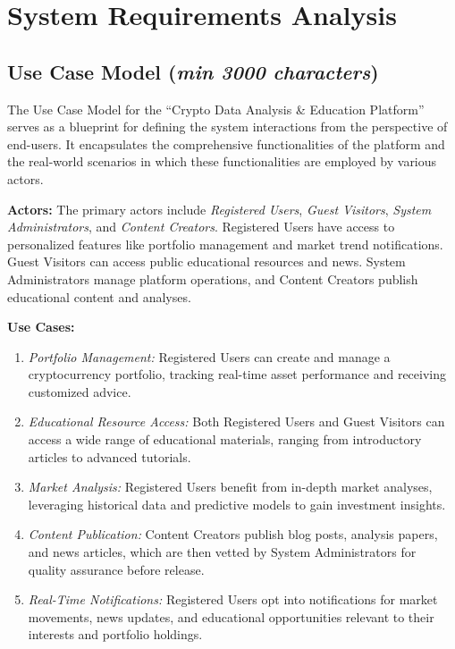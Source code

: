 \documentclass[12pt]{report}
\newcommand{\characters}[1]{(\textit{min #1 characters})}
\begin{document}
\section{System Requirements Analysis}

\subsection{Use Case Model \characters{3000}}
The Use Case Model for the ``Crypto Data Analysis \& Education Platform'' serves as a blueprint for defining the system interactions from the perspective of end-users. It encapsulates the comprehensive functionalities of the platform and the real-world scenarios in which these functionalities are employed by various actors.

\textbf{Actors:} The primary actors include \textit{Registered Users}, \textit{Guest Visitors}, \textit{System Administrators}, and \textit{Content Creators}. Registered Users have access to personalized features like portfolio management and market trend notifications. Guest Visitors can access public educational resources and news. System Administrators manage platform operations, and Content Creators publish educational content and analyses.

\textbf{Use Cases:}
\begin{enumerate}
    \item \textit{Portfolio Management:} Registered Users can create and manage a cryptocurrency portfolio, tracking real-time asset performance and receiving customized advice.
    \item \textit{Educational Resource Access:} Both Registered Users and Guest Visitors can access a wide range of educational materials, ranging from introductory articles to advanced tutorials.
    \item \textit{Market Analysis:} Registered Users benefit from in-depth market analyses, leveraging historical data and predictive models to gain investment insights.
    \item \textit{Content Publication:} Content Creators publish blog posts, analysis papers, and news articles, which are then vetted by System Administrators for quality assurance before release.
    \item \textit{Real-Time Notifications:} Registered Users opt into notifications for market movements, news updates, and educational opportunities relevant to their interests and portfolio holdings.
\end{enumerate}
\end{document}
